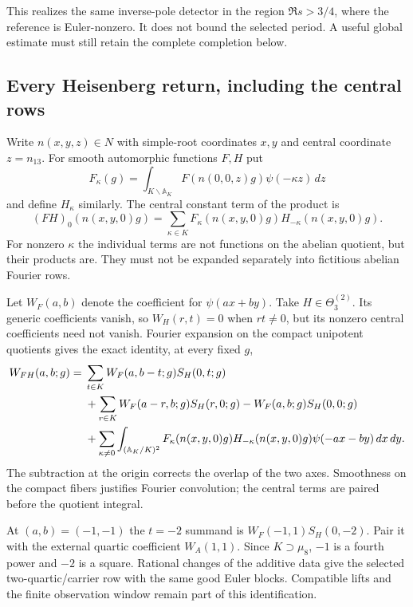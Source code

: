 \documentclass[11pt]{article}
\begin{document}
This realizes the same inverse-pole detector in the region
$\Re s>3/4$, where the reference is Euler-nonzero.
It does not bound the selected period. A useful global estimate
must still retain the complete completion below.

\subsection{Every Heisenberg return, including the central rows}
Write $n(x,y,z)\in N$ with simple-root coordinates $x,y$ and central
coordinate $z=n_{13}$. For smooth automorphic functions $F,H$ put
\[
 F_\kappa(g)=\int_{K\backslash\mathbb A_K}
        F(n(0,0,z)g)\psi(-\kappa z)\,dz
\]
and define $H_\kappa$ similarly. The central constant term of
the product is
\[
 (FH)_0(n(x,y,0)g)=
       \sum_{\kappa\in K}F_\kappa(n(x,y,0)g)
                              H_{-\kappa}(n(x,y,0)g).
\]
For nonzero $\kappa$ the individual terms are not functions on
the abelian quotient, but their products are. They must not
be expanded separately into fictitious abelian Fourier rows.

Let $W_F(a,b)$ denote the coefficient for
$\psi(ax+by)$. Take $H\in\Theta^{(2)}_3$.
Its generic coefficients vanish, so $W_H(r,t)=0$ when $rt\ne0$,
but its nonzero central coefficients need not vanish.
Fourier expansion on the compact unipotent quotients gives the
exact identity, at every fixed $g$,
\begin{align}
 W_{FH}(a,b;g)
 ={}&\sum_{t\in K}W_F(a,b-t;g)S_H(0,t;g)\notag\\
 &+\sum_{r\in K}W_F(a-r,b;g)S_H(r,0;g)
       -W_F(a,b;g)S_H(0,0;g)\notag\\
 &+\sum_{\kappa\ne0}\int_{(\mathbb A_K/K)^2}
       F_\kappa(n(x,y,0)g)H_{-\kappa}(n(x,y,0)g)
                         \psi(-ax-by)\,dx\,dy .
 \label{eq:quadratic-full-completion}
\end{align}
The subtraction at the origin corrects the overlap of the two axes.
Smoothness on the compact fibers justifies Fourier convolution;
the central terms are paired before the quotient integral.

At $(a,b)=(-1,-1)$ the $t=-2$ summand is
$W_F(-1,1)S_H(0,-2)$. Pair it with the external quartic coefficient
$W_A(1,1)$. Since $K\supset\mu_8$, $-1$ is a fourth power and
$-2$ is a square. Rational changes of the additive data give
the selected two-quartic/carrier row with the same good Euler
blocks. Compatible lifts and the finite observation window
remain part of this identification.
\end{document}
